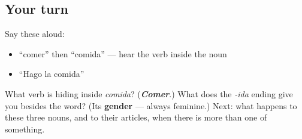 \subsection*{Your turn}
Say these aloud:

\begin{itemize}
\raggedright
  \item \textquotedblleft{}comer\textquotedblright{} then \textquotedblleft{}comida\textquotedblright{} — hear the verb inside the noun
  \item \textquotedblleft{}Hago la comida\textquotedblright{}
\end{itemize}

\begin{tcolorbox}[breakable,colback=teal!4,colframe=teal!35!black,title={Before you move on}]
What verb is hiding inside \emph{comida}? (\emph{\textbf{Comer}}.) What does the \emph{-ida} ending give you besides the word? (Its \textbf{gender} — always feminine.) Next: what happens to these three nouns, and to their articles, when there is more than one of something.
\end{tcolorbox}
